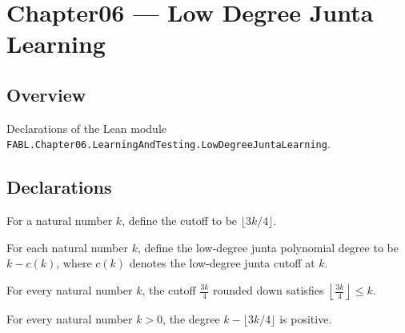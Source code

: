 \chapter{Chapter06 — Low Degree Junta Learning}
\section{Overview}

Declarations of the Lean module \texttt{FABL.Chapter06.LearningAndTesting.LowDegreeJuntaLearning}.

\section{Declarations}

\begin{definition}
\label{FABL.lowDegreeJuntaCutoff}
\leanok
For a natural number $k$, define the cutoff to be $\lfloor 3k/4\rfloor$.
\end{definition}

\begin{definition}
\label{FABL.lowDegreeJuntaPolynomialDegree}
\leanok
{}
For each natural number $k$, define the low-degree junta polynomial degree to be
$k-c(k)$, where $c(k)$ denotes the low-degree junta cutoff at $k$.
\end{definition}

\begin{theorem}
\label{FABL.lowDegreeJuntaCutoff_le}
\leanok
{}
For every natural number $k$, the cutoff $\frac{3k}{4}$ rounded down satisfies
$\left\lfloor\frac{3k}{4}\right\rfloor\le k$.
\end{theorem}

\begin{theorem}
\label{FABL.lowDegreeJuntaPolynomialDegree_pos}
\leanok
{}
For every natural number $k>0$, the degree $k-\lfloor3k/4\rfloor$ is positive.
\end{theorem}

